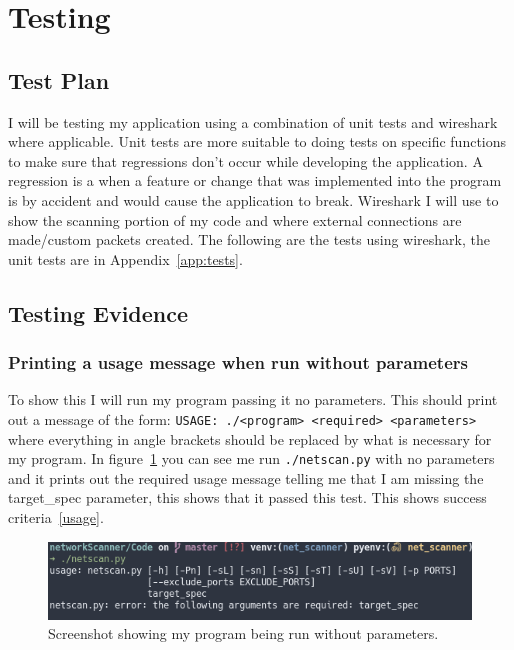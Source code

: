 \documentclass[titlepage]{article}
\let\Oldsection\section{}
\renewcommand{\section}{\FloatBarrier\Oldsection}
\let\Oldsubsection\subsection{}
\renewcommand{\subsection}{\FloatBarrier\Oldsubsection}
\let\Oldsubsubsection\subsubsection{}
\renewcommand{\subsubsection}{\FloatBarrier\Oldsubsubsection}
\begin{document}
\section{Testing}

\subsection{Test Plan}

I will be testing my application using a combination of unit tests and wireshark where applicable.
Unit tests are more suitable to doing tests on specific functions to make sure that regressions don't occur while developing
the application. A regression is a when a feature or change that was implemented into the program is by accident and would 
cause the application to break. Wireshark I will use to show the scanning portion of my code and where external connections
are made/custom packets created. The following are the tests using wireshark,
the unit tests are in Appendix~\ref{app:tests}.

\subsection{Testing Evidence}

\subsubsection{Printing a usage message when run without parameters}

To show this I will run my program passing it no parameters.
This should print out a message of the form: \verb|USAGE: ./<program> <required> <parameters>|
where everything in angle brackets should be replaced by what is necessary for my program. 
In figure~\ref{noparametertest} you can see me run \verb|./netscan.py| with no parameters and it
prints out the required usage message telling me that I am missing the target\_spec parameter, this
shows that it passed this test.
This shows success criteria~\ref{usage}.
\begin{figure}[H]
  \centering
  \includegraphics[width=\textwidth]{noparameters.png}
  \caption{%
    Screenshot showing my program being run without parameters.
  }\label{noparametertest}
\end{figure}
\end{document}
